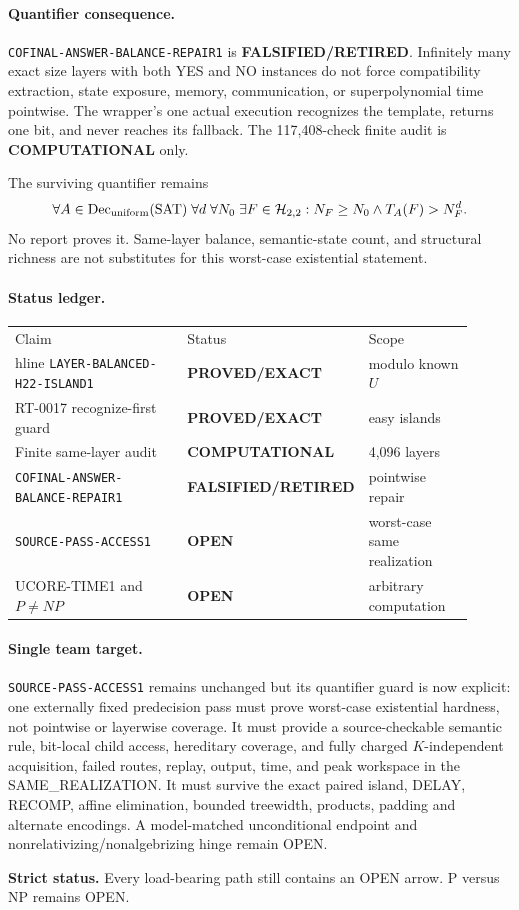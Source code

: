 \documentclass[11pt]{article}
\begin{document}
\paragraph{Quantifier consequence.}
\texttt{COFINAL-ANSWER-BALANCE-REPAIR1} is
\textbf{FALSIFIED/RETIRED}.  Infinitely many exact size layers with both YES
and NO instances do not force compatibility extraction, state exposure,
memory, communication, or superpolynomial time pointwise.  The wrapper's one
actual execution recognizes the template, returns one bit, and never reaches
its fallback.  The 117,408-check finite audit is \textbf{COMPUTATIONAL} only.

The surviving quantifier remains
\[
 \forall A\in\operatorname{Dec}_{\rm uniform}(\mathrm{SAT})\;
 \forall d\;\forall N_0\;\exists F\in\mathcal H_{2,2}:
 N_F\ge N_0\land T_A(F)>N_F^d.
\]
No report proves it.  Same-layer balance, semantic-state count, and structural
richness are not substitutes for this worst-case existential statement.

\paragraph{Status ledger.}
\begin{center}\small
\begin{tabular}{p{0.45\linewidth}p{0.22\linewidth}p{0.24\linewidth}}
\hline
Claim & Status & Scope \\hline
\texttt{LAYER-BALANCED-H22-ISLAND1} & \textbf{PROVED/EXACT} & modulo known $U$ \\
RT-0017 recognize-first guard & \textbf{PROVED/EXACT} & easy islands \\
Finite same-layer audit & \textbf{COMPUTATIONAL} & 4,096 layers \\
\texttt{COFINAL-ANSWER-BALANCE-REPAIR1} & \textbf{FALSIFIED/RETIRED} & pointwise repair \\
\texttt{SOURCE-PASS-ACCESS1} & \textbf{OPEN} & worst-case same realization \\
UCORE-TIME1 and $P\ne NP$ & \textbf{OPEN} & arbitrary computation \\\hline
\end{tabular}
\end{center}

\paragraph{Single team target.}
\texttt{SOURCE-PASS-ACCESS1} remains unchanged but its quantifier guard is
now explicit: one externally fixed predecision pass must prove worst-case
existential hardness, not pointwise or layerwise coverage.  It must provide a
source-checkable semantic rule, bit-local child access, hereditary coverage,
and fully charged $K$-independent acquisition, failed routes, replay, output,
time, and peak workspace in the SAME\_REALIZATION.  It must survive the exact
paired island, DELAY, RECOMP, affine elimination, bounded treewidth, products,
padding and alternate encodings.  A model-matched unconditional endpoint and
nonrelativizing/nonalgebrizing hinge remain OPEN.

\textbf{Strict status.} Every load-bearing path still contains an OPEN arrow.
P versus NP remains OPEN.
\end{document}
